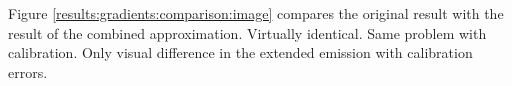 Figure \ref{results:gradients:comparison:image} compares the original result with the result of the combined approximation. Virtually identical. Same problem with calibration. Only visual difference in the extended emission with calibration errors. 




